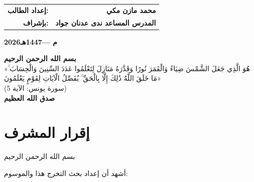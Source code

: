 \documentclass[12pt, a4paper]{report}
\begin{document}
\begin{titlepage}
\begin{center}
\vspace{0.2cm}

\begin{tabular}{rr}
\textbf{\large إعداد الطالب:}  & \textbf{\large محمد مازن مكي} \\[0.5cm]
\textbf{\large بإشراف:}        & \textbf{\large المدرس المساعد ندى عدنان جواد} \\
\end{tabular}
\vspace{0.2cm}
\vfill
{\large\bfseries 2026م \quad---\quad 1447هـ}

\end{center}
\end{titlepage}

\newpage\thispagestyle{empty}
\vspace*{4cm}
\begin{center}
{\Large\bfseries بسم الله الرحمن الرحيم}\\[1cm]
{\large
«هُوَ الَّذِي جَعَلَ الشَّمْسَ ضِيَاءً وَالْقَمَرَ نُورًا وَقَدَّرَهُ مَنَازِلَ لِتَعْلَمُوا عَدَدَ السِّنِينَ وَالْحِسَابَ ۚ مَا خَلَقَ اللَّهُ ذَٰلِكَ إِلَّا بِالْحَقِّ ۚ يُفَصِّلُ الْآيَاتِ لِقَوْمٍ يَعْلَمُونَ»\\[0.5cm]
(سورة يونس: الآية 5)
}\\[0.8cm]
{\large\bfseries صدق الله العظيم}
\end{center}
\newpage
\newpage\thispagestyle{empty}
\chapter*{إقرار المشرف}

\noindent بسم الله الرحمن الرحيم

\vspace{0.5cm}
\noindent أشهد أن إعداد بحث التخرج هذا والموسوم:

\begin{center}
\end{center}
\end{document}
